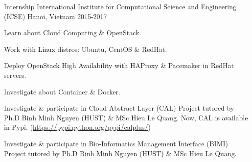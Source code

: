 \begin{cventries}
  \cventry
    {Internship} %
    {International Institute for Computational Science and Engineering (ICSE)} %
    {Hanoi, Vietnam} %
    {2015-2017} %
    {
      \begin{cvitems} %
        \item {Learn about Cloud Computing \& OpenStack.}
        \item {Work with Linux distros: Ubuntu, CentOS \& RedHat.}
        \item {Deploy OpenStack High Availability with HAProxy \& Pacemaker in RedHat servers.}
        \item {Investigate about Container \& Docker.}
        \item {Investigate \& participate in Cloud Abstract Layer (CAL) Project tutored by Ph.D Binh Minh Nguyen (HUST) \& MSc Hieu Le Quang. Now, CAL is available in Pypi. (\url{https://pypi.python.org/pypi/calplus/})}
        \item {Investigate \& participate in Bio-Informatics Management Interface (BIMI) Project tutored by Ph.D Binh Minh Nguyen (HUST) \& MSc Hieu Le Quang.}
      \end{cvitems}
    }

\end{cventries}
